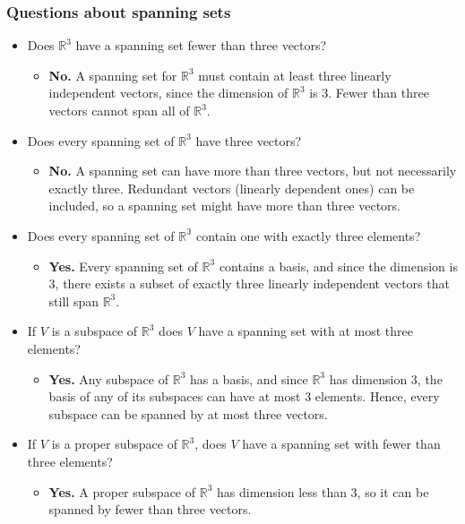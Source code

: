 \documentclass[a4paper, 9pt]{extarticle}
\begin{document}
\subsubsection{Questions about spanning sets}
\begin{itemize}

  \item Does $\mathbb{R}^3$ have a spanning set fewer than three vectors?
        \begin{itemize}
          \item \textbf{No.} A spanning set for $\mathbb{R}^3$ must contain at least three linearly independent vectors, since the dimension of $\mathbb{R}^3$ is 3. Fewer than three vectors cannot span all of $\mathbb{R}^3$.
        \end{itemize}
  \item Does every spanning set of $\mathbb{R}^3$ have three vectors?
        \begin{itemize}
          \item \textbf{No.} A spanning set can have more than three vectors, but not necessarily exactly three. Redundant vectors (linearly dependent ones) can be included, so a spanning set might have more than three vectors.
        \end{itemize}
  \item Does every spanning set of $\mathbb{R^3}$ contain one with exactly three elements?
        \begin{itemize}
          \item \textbf{Yes.} Every spanning set of $\mathbb{R}^3$ contains a basis, and since the dimension is 3, there exists a subset of exactly three linearly independent vectors that still span $\mathbb{R}^3$.
        \end{itemize}
  \item If $V$ is a subspace of $\mathbb{R}^3$ does $V$ have a spanning set with at most three elements?
        \begin{itemize}
          \item \textbf{Yes.} Any subspace of $\mathbb{R}^3$ has a basis, and since $\mathbb{R}^3$ has dimension 3, the basis of any of its subspaces can have at most 3 elements. Hence, every subspace can be spanned by at most three vectors.
        \end{itemize}
  \item If $V$ is a proper subspace of $\mathbb{R}^3$, does $V$ have a spanning set with fewer than three elements?
        \begin{itemize}
          \item \textbf{Yes.} A proper subspace of $\mathbb{R}^3$ has dimension less than 3, so it can be spanned by fewer than three vectors.
        \end{itemize}
\end{itemize}
\end{document}
